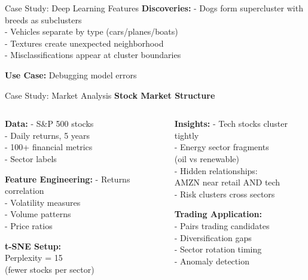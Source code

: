 \documentclass[10pt]{beamer}
\newcommand{\emphtext}[1]{\textcolor{upcblue}{\textbf{#1}}}
\newcommand{\warningbox}[1]{\colorbox{red!10}{\begin{minipage}{0.85\textwidth}\centering #1\end{minipage}}}
\begin{document}
\begin{frame}{Case Study: Deep Learning Features}
\vspace{0.3cm}
\textbf{Discoveries:}
\footnotesize
- Dogs form supercluster with breeds as subclusters\\
- Vehicles separate by type (cars/planes/boats)\\
- Textures create unexpected neighborhood\\
- Misclassifications appear at cluster boundaries

\begin{center}
\warningbox{\footnotesize\textbf{Use Case:} Debugging model errors}
\end{center}
\end{frame}

\begin{frame}{Case Study: Market Analysis}
\emphtext{Stock Market Structure}

\vspace{0.3cm}
\begin{columns}[T]
\begin{column}{0.48\textwidth}
\textbf{Data:}
\footnotesize
- S\&P 500 stocks\\
- Daily returns, 5 years\\
- 100+ financial metrics\\
- Sector labels

\vspace{0.2cm}
\textbf{Feature Engineering:}
\footnotesize
- Returns correlation\\
- Volatility measures\\
- Volume patterns\\
- Price ratios

\vspace{0.2cm}
\textbf{t-SNE Setup:}\\
Perplexity = 15\\
(fewer stocks per sector)
\end{column}

\begin{column}{0.48\textwidth}
\textbf{Insights:}
\footnotesize
- Tech stocks cluster tightly\\
- Energy sector fragments\\
  (oil vs renewable)\\
- Hidden relationships:\\
  AMZN near retail AND tech\\
- Risk clusters cross sectors

\vspace{0.2cm}
\textbf{Trading Application:}\\
- Pairs trading candidates\\
- Diversification gaps\\
- Sector rotation timing\\
- Anomaly detection
\end{column}
\end{columns}


\end{frame}
\end{document}
